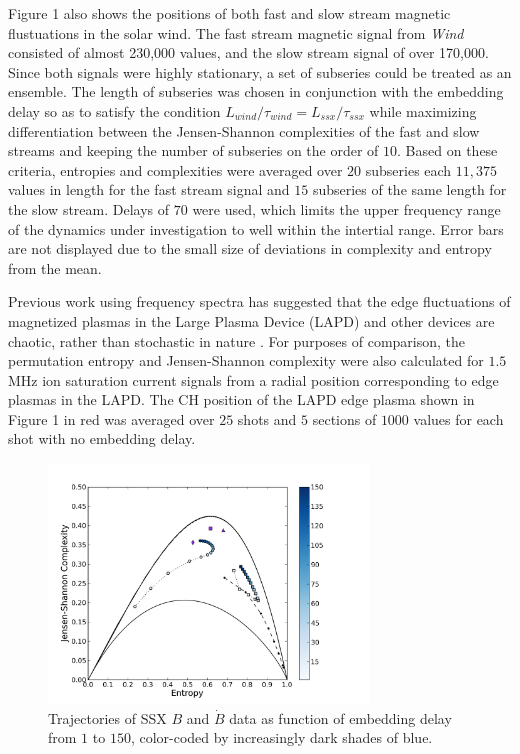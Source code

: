 \documentclass[aps,twocolumn,secnumarabic,nobalancelastpage,amsmath,amssymb,
nofootinbib]{revtex4-1}
\begin{document}
Figure 1 also shows the positions of both fast and slow stream magnetic flustuations in the solar wind.  The fast stream magnetic signal from \textit{Wind} consisted of almost 230,000 values, and the slow stream signal of over 170,000. Since both signals were highly stationary, a set of subseries could be treated as an ensemble. The length of subseries was chosen in conjunction with the embedding delay so as to satisfy the condition $L_{wind}/\tau_{wind} = L_{ssx}/\tau_{ssx}$ while maximizing differentiation between the Jensen-Shannon complexities of the fast and slow streams and keeping the number of subseries on the order of $10$. Based on these criteria, entropies and complexities were averaged over $20$ subseries each $11,375$ values in length for the fast stream signal and $15$ subseries of the same length for the slow stream. Delays of $70$ were used, which limits the  upper frequency range of the dynamics under investigation to well within the intertial range. Error bars are not displayed due to the small size of deviations in complexity and entropy from the mean.

Previous work using frequency spectra has suggested that the edge fluctuations of magnetized plasmas in the Large Plasma Device (LAPD) and other devices are chaotic, rather than stochastic in nature \cite{maggs2012}. For purposes of comparison, the permutation entropy and Jensen-Shannon complexity were also calculated for $1.5$ MHz ion saturation current signals from a radial position corresponding to edge plasmas in the LAPD.  The CH position of the LAPD edge plasma shown in Figure 1 in red was averaged over $25$ shots and $5$ sections of $1000$ values for each shot with no embedding delay. 

\begin{figure}[!htbp]
\centerline{
\includegraphics[width=8.5cm]{fig3.png}}
\caption{\label{Figure 3}Trajectories of SSX $B$ and $\dot{B}$ data as function of embedding delay from $1$ to $150$, color-coded by increasingly dark shades of blue. }
\end{figure} 
\end{document}
